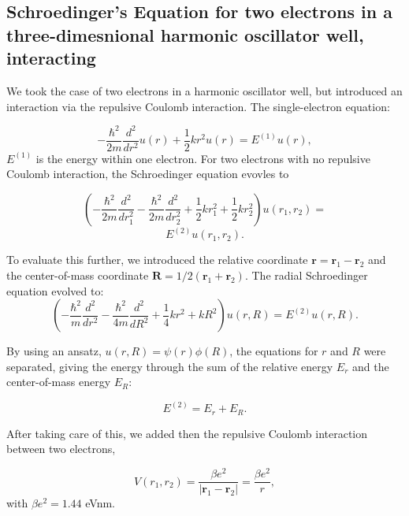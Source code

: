 \documentclass[%
reprint,
superscriptaddress,
showpacs,
nofootinbib,
bibnotes,amsmath,amssymb,aps,
prc, 
]{revtex4-1}
\begin{document}
\subsection{Schroedinger's Equation for two electrons in a three-dimesnional harmonic oscillator well, interacting}	
We took the case of two electrons in a harmonic oscillator well, but
introduced an interaction via the repulsive Coulomb interaction.
The single-electron equation:

\begin{equation*}
	-\frac{\hbar^2}{2 m} \frac{d^2}{dr^2} u(r) 
	+ \frac{1}{2}k r^2u(r)  = E^{(1)} u(r),
\end{equation*}
$E^{(1)}$ is the energy within one electron.
For two electrons with no repulsive Coulomb interaction, the
Schroedinger equation evovles to

\begin{equation*}
	\left(  -\frac{\hbar^2}{2 m} \frac{d^2}{dr_1^2} -\frac{\hbar^2}{2 m} \frac{d^2}{dr_2^2}+ \frac{1}{2}k r_1^2+ \frac{1}{2}k r_2^2\right)u(r_1,r_2)  =
\end{equation*}
\begin{equation*}
	E^{(2)} u(r_1,r_2) .
\end{equation*}

To evaluate this further, we introduced the relative coordinate $\mathbf{r} = \mathbf{r}_1-\mathbf{r}_2$
and the center-of-mass coordinate $\mathbf{R} = 1/2(\mathbf{r}_1+\mathbf{r}_2)$.
The radial Schroedinger equation evolved to:
\begin{equation*}
	\left(  -\frac{\hbar^2}{m} \frac{d^2}{dr^2} -\frac{\hbar^2}{4 m} \frac{d^2}{dR^2}+ \frac{1}{4} k r^2+  kR^2\right)u(r,R)  = E^{(2)} u(r,R).
\end{equation*}

By using an ansatz, $u(r,R) = \psi(r)\phi(R)$, the equations for $r$ and $R$ were separated, giving the energy through the sum
of the relative energy $E_r$ and the center-of-mass energy $E_R$:

\begin{equation*}
	E^{(2)}=E_r+E_R.
\end{equation*}

After taking care of this, we added then the repulsive Coulomb interaction between two electrons,

\begin{equation*}
	V(r_1,r_2) = \frac{\beta e^2}{|\mathbf{r}_1-\mathbf{r}_2|}=\frac{\beta e^2}{r},
\end{equation*}
with $\beta e^2=1.44$ eVnm.
\end{document}
